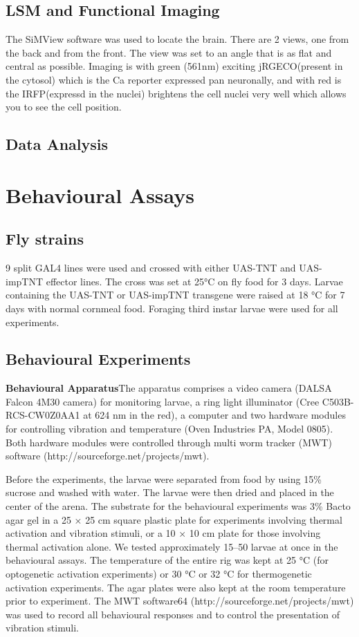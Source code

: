 \subsection{LSM and Functional Imaging}
The SiMView software was used to locate the brain. There are 2 views, one from the back and from the front. The view was set to an angle that is as flat and central as possible. Imaging is with green (561nm) exciting jRGECO(present in the cytosol) which is the Ca reporter expressed pan neuronally, and with red is the IRFP(expressd in the nuclei) brightens the cell nuclei very well which allows you to see the cell position. 


\subsection{Data Analysis}



\section{Behavioural Assays}
\subsection{Fly strains}
9 split GAL4 lines were used and crossed with either UAS-TNT and UAS-impTNT effector lines.
The cross was set at 25°C on fly food for 3 days. Larvae containing the UAS-TNT or UAS-impTNT transgene were raised at 18 °C for 7 days with normal cornmeal food. Foraging third instar larvae were used for all experiments. 

\subsection{Behavioural Experiments}
\textbf{Behavioural Apparatus}The apparatus comprises a video camera (DALSA Falcon 4M30 camera) for monitoring larvae, a ring light illuminator (Cree C503B-RCS-CW0Z0AA1 at 624 nm in the red), a computer and two hardware modules for controlling vibration and temperature (Oven Industries PA, Model 0805). Both hardware modules were controlled through multi worm tracker (MWT) software (http://sourceforge.net/projects/mwt). %


Before the experiments, the larvae were separated from food by using 15\% sucrose and washed with water. The larvae were then dried and placed in the center of the arena. The substrate for the behavioural experiments was 3\% Bacto agar gel in a 25 × 25 cm square plastic plate for experiments involving thermal activation and vibration stimuli, or a 10 × 10 cm plate for those involving thermal activation alone. We tested approximately 15–50 larvae at once in the behavioural assays. The temperature of the entire rig was kept at 25 °C (for optogenetic activation experiments) or 30 °C or 32 °C for thermogenetic activation experiments. The agar plates were also kept at the room temperature prior to experiment. The MWT software64 (http://sourceforge.net/projects/mwt) was used to record all behavioural responses and to control the presentation of vibration stimuli. %

